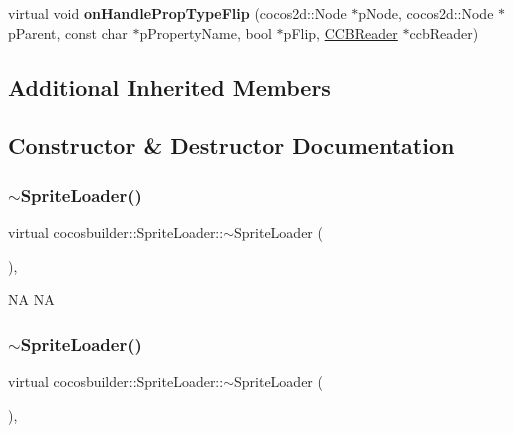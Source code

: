 \begin{DoxyCompactItemize}
\item 
\mbox{\label{classcocosbuilder_1_1SpriteLoader_acef60895c79cede41beeab87d8c856a3}} 
virtual void {\bfseries on\+Handle\+Prop\+Type\+Flip} (cocos2d\+::\+Node $\ast$p\+Node, cocos2d\+::\+Node $\ast$p\+Parent, const char $\ast$p\+Property\+Name, bool $\ast$p\+Flip, \hyperlink{classcocosbuilder_1_1CCBReader}{C\+C\+B\+Reader} $\ast$ccb\+Reader)
\end{DoxyCompactItemize}
\subsection*{Additional Inherited Members}


\subsection{Constructor \& Destructor Documentation}
\mbox{\label{classcocosbuilder_1_1SpriteLoader_ab033b5aea9728e5d7903cb48f9fa652d}} 
\subsubsection{\texorpdfstring{$\sim$\+Sprite\+Loader()}{~SpriteLoader()}\hspace{0.1cm}{\footnotesize\ttfamily [1/2]}}
{\footnotesize\ttfamily virtual cocosbuilder\+::\+Sprite\+Loader\+::$\sim$\+Sprite\+Loader (\begin{DoxyParamCaption}{ }\end{DoxyParamCaption})\hspace{0.3cm}{\ttfamily [inline]}, {\ttfamily [virtual]}}

NA  NA \mbox{\label{classcocosbuilder_1_1SpriteLoader_ab033b5aea9728e5d7903cb48f9fa652d}} 
\subsubsection{\texorpdfstring{$\sim$\+Sprite\+Loader()}{~SpriteLoader()}\hspace{0.1cm}{\footnotesize\ttfamily [2/2]}}
{\footnotesize\ttfamily virtual cocosbuilder\+::\+Sprite\+Loader\+::$\sim$\+Sprite\+Loader (\begin{DoxyParamCaption}{ }\end{DoxyParamCaption})\hspace{0.3cm}{\ttfamily [inline]}, {\ttfamily [virtual]}}

